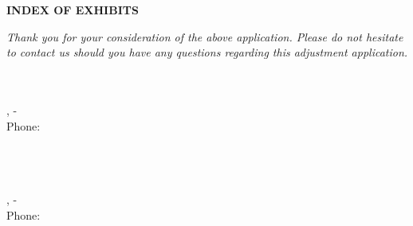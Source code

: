 \documentclass{letter}
\newcounter{labelcounter}
\newcommand{\centerlabel}[1]{
\stepcounter{labelcounter}
\newpage

    \thispagestyle{empty}
    \begin{center}
        \vspace*{\fill}
        \Huge Exhibit-\thelabelcounter \\ \vspace{1cm} \large #1
        \vspace*{\fill}
    \end{center}
    \newpage
}
\begin{document}
\begin{center}
\textbf{INDEX OF EXHIBITS}\\
\end{center}

\vspace{1.5cm}

\vfill

\textit{Thank you for your consideration of the above application. Please do not hesitate to contact us should you have any questions regarding this adjustment application.}

\begin{minipage}[t]{0.5\textwidth}

\vspace{2cm}
\textbf{\pApplicant} \\
\pAddress\\
\pCity, \pState - \pZip\\
Phone: \pPhone \\
\pEmail \\
\end{minipage}%
\begin{minipage}[t]{0.5\textwidth}
\vspace{2cm}
\begin{flushright}
\textbf{\dApplicant} \\
\dAddress\\
\dCity, \dState - \dZip\\
Phone: \dPhone \\
\dEmail\\
\end{flushright}
\end{minipage}













% 
% 
\end{document}

